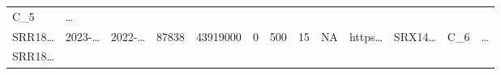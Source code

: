 \documentclass[
]{article}
\begin{document}
\begin{longtable}[]{@{}lllllllllllll@{}}
\begin{minipage}[t]{0.08\columnwidth}
C\_5\strut
\end{minipage} & \begin{minipage}[t]{0.02\columnwidth}\raggedright
\ldots{}\strut
\end{minipage}\tabularnewline
\begin{minipage}[t]{0.05\columnwidth}\raggedright
SRR18\ldots{}\strut
\end{minipage} & \begin{minipage}[t]{0.05\columnwidth}\raggedright
2023-\ldots{}\strut
\end{minipage} & \begin{minipage}[t]{0.05\columnwidth}\raggedright
2022-\ldots{}\strut
\end{minipage} & \begin{minipage}[t]{0.04\columnwidth}\raggedright
87838\strut
\end{minipage} & \begin{minipage}[t]{0.05\columnwidth}\raggedright
43919000\strut
\end{minipage} & \begin{minipage}[t]{0.05\columnwidth}\raggedright
0\strut
\end{minipage} & \begin{minipage}[t]{0.05\columnwidth}\raggedright
500\strut
\end{minipage} & \begin{minipage}[t]{0.05\columnwidth}\raggedright
15\strut
\end{minipage} & \begin{minipage}[t]{0.05\columnwidth}\raggedright
NA\strut
\end{minipage} & \begin{minipage}[t]{0.05\columnwidth}\raggedright
https\ldots{}\strut
\end{minipage} & \begin{minipage}[t]{0.05\columnwidth}\raggedright
SRX14\ldots{}\strut
\end{minipage} & \begin{minipage}[t]{0.08\columnwidth}\raggedright
C\_6\strut
\end{minipage} & \begin{minipage}[t]{0.02\columnwidth}\raggedright
\ldots{}\strut
\end{minipage}\tabularnewline
\begin{minipage}[t]{0.05\columnwidth}\raggedright
SRR18\ldots{}\strut
\end{minipage} & \begin{minipage}[t]{0.05\columnwidth}\raggedright

\end{minipage}
\end{longtable}
\end{document}
